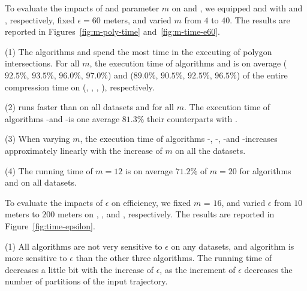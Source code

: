 To evaluate the impacts of \rpia and parameter $m$ on \cist and \cista, we
equipped \cist and \cista with \rpia and \cpia, respectively, fixed $\epsilon =60$ meters, and varied $m$ from $4$ to $40$.
%
The results are reported in Figures~\ref{fig:m-poly-time} and~\ref{fig:m-time-e60}.

\ni(1) The algorithms \cist and \cista spend the most time in the executing of polygon intersections. For all $m$, the execution time of algorithms \cpia and \rpia is on average ($92.5\%$, $93.5\%$, $96.0\%$, $97.0\%$) and ($89.0\%$, $90.5\%$, $92.5\%$, $96.5\%$) of the entire compression time on (\truck, \sercar, \geolife, \pricar), respectively.

\ni(2) \rpia runs faster than \cpia on all datasets and for all $m$. The execution time of algorithms \cist-\rpia and \cista-\rpia is one average $81.3\%$ their counterparts with \cpia.

\ni(3) When varying $m$, the execution time of algorithms \cist-\rpia, \cist-\cpia, \cista-\rpia and \cista-\cpia increases approximately linearly with the increase of $m$ on all the datasets.

\ni(4) The running time of $m=12$ is on average {$71.2\%$} of $m=20$ for algorithms \cist and \cista on all datasets.




To evaluate the impacts of $\epsilon$ on efficiency, we fixed $m$ = $16$, and varied $\epsilon$  from $10$ meters to $200$ meters on \truck, \sercar, \geolife and \pricar, respectively.
The results are reported in Figure~\ref{fig:time-epsilon}.

\ni(1) All algorithms are not very sensitive to $\epsilon$ on any datasets, and algorithm \dps is more sensitive to $\epsilon$ than the other three algorithms.
The running time of \dps decreases a little bit with the increase of $\epsilon$, as the increment of $\epsilon$ decreases the number of partitions of the input trajectory.


